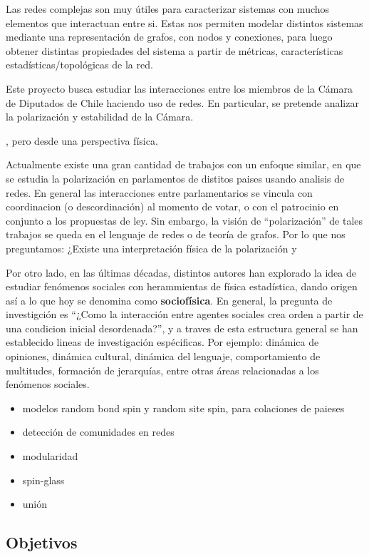 \documentclass{proyectotesis}
\begin{document}
Las redes complejas son muy útiles para caracterizar sistemas con muchos elementos que interactuan entre si. Estas nos permiten modelar distintos sistemas mediante una representación de grafos, con nodos y conexiones, para luego obtener distintas propiedades del sistema a partir de métricas, características estadísticas/topológicas de la red.

Este proyecto busca estudiar las interacciones entre los miembros de la Cámara de Diputados de Chile haciendo uso de redes.
 En particular, se pretende analizar la polarización y estabilidad de la Cámara.

 , pero desde una perspectiva física.


Actualmente existe una gran cantidad de trabajos con un enfoque similar, en que se estudia la polarización en parlamentos de distitos paises usando analisis de redes. En general las interacciones entre parlamentarios se vincula con coordinacion (o descordinación) al momento de votar, o con el patrocinio en conjunto a los propuestas de ley. Sin embargo, la visión de ``polarización'' de tales trabajos se queda en el lenguaje de redes o de teoría de grafos. Por lo que nos preguntamos: ¿Existe una interpretación física de la polarización y 


Por otro lado, en las últimas décadas, distintos autores han explorado la idea de estudiar fenómenos sociales con herammientas de física estadística, dando origen así a lo que hoy se denomina como \textbf{sociofísica}. En general, la pregunta de investigción es ``¿Como la interacción entre agentes sociales crea orden a partir de una condicion inicial desordenada?'', y a traves de esta estructura general se han establecido lineas de investigación espécificas. Por ejemplo: dinámica de opiniones, dinámica cultural, dinámica del lenguaje, comportamiento de multitudes, formación de jerarquías, entre otras áreas relacionadas a los fenómenos sociales. 

\begin{itemize}
    \item modelos random bond spin y random site spin, para colaciones de paieses
    \item detección de comunidades en redes
    \item modularidad
    \item spin-glass
    \item unión
\end{itemize}

\subsection{Objetivos}
\end{document}
